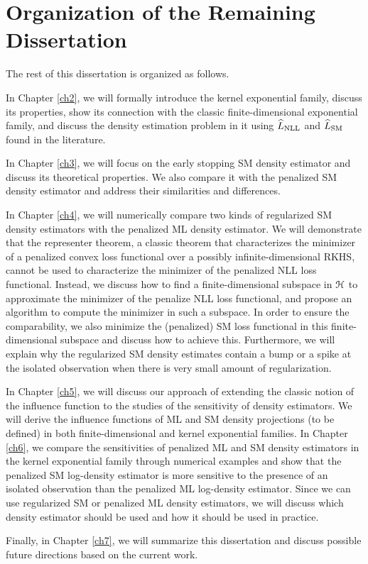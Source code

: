 \section{Organization of the Remaining Dissertation}\label{section-organization}

The rest of this dissertation is organized as follows. 

In Chapter \ref{ch2}, we will formally introduce the kernel exponential family, discuss its properties, show its connection with the classic finite-dimensional exponential family, and discuss the density estimation problem in it using $\widehat{L}_{\mathrm{NLL}}$ and $\widehat{L}_{\mathrm{SM}}$ found in the literature. 

In Chapter \ref{ch3}, we will focus on the early stopping SM density estimator and discuss its theoretical properties. We also compare it with the penalized SM density estimator and address their similarities and differences. 

In Chapter \ref{ch4}, we will numerically compare two kinds of regularized SM density estimators with the penalized ML density estimator. We will demonstrate that the representer theorem, a classic theorem that characterizes the minimizer of a penalized convex loss functional over a possibly infinite-dimensional RKHS, cannot be used to characterize the minimizer of the penalized NLL loss functional. Instead, we discuss how to find a finite-dimensional subspace in $\mathcal{H}$ to approximate the minimizer of the penalize NLL loss functional, and propose an algorithm to compute the minimizer in such a subspace. In order to ensure the comparability, we also minimize the (penalized) SM loss functional in this finite-dimensional subspace and discuss how to achieve this. Furthermore, we will explain why the regularized SM density estimates contain a bump or a spike at the isolated observation when there is very small amount of regularization. 

In Chapter \ref{ch5}, we will discuss our approach of extending the classic notion of the influence function to the studies of the sensitivity of density estimators. We will derive the influence functions of ML and SM density projections (to be defined) in both finite-dimensional and kernel exponential families. In Chapter \ref{ch6}, we compare the sensitivities of penalized ML and SM density estimators in the kernel exponential family through numerical examples and show that the penalized SM log-density estimator is more sensitive to the presence of an isolated observation than the penalized ML log-density estimator. Since we can use regularized SM or penalized ML density estimators, we will discuss which density estimator should be used and how it should be used in practice. 

Finally, in Chapter \ref{ch7}, we will summarize this dissertation and discuss possible future directions based on the current work. 
